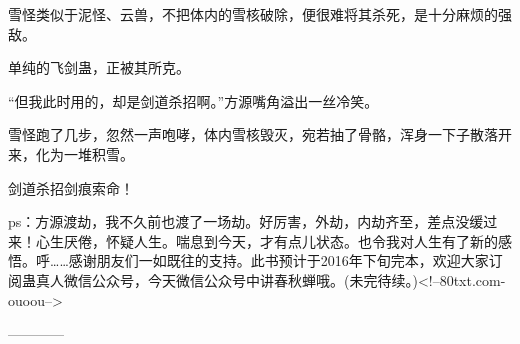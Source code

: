 \begin{this_body}
雪怪类似于泥怪、云兽，不把体内的雪核破除，便很难将其杀死，是十分麻烦的强敌。

单纯的飞剑蛊，正被其所克。

“但我此时用的，却是剑道杀招啊。”方源嘴角溢出一丝冷笑。

雪怪跑了几步，忽然一声咆哮，体内雪核毁灭，宛若抽了骨骼，浑身一下子散落开来，化为一堆积雪。

剑道杀招剑痕索命！

ps：方源渡劫，我不久前也渡了一场劫。好厉害，外劫，内劫齐至，差点没缓过来！心生厌倦，怀疑人生。喘息到今天，才有点儿状态。也令我对人生有了新的感悟。呼……感谢朋友们一如既往的支持。此书预计于2016年下旬完本，欢迎大家订阅蛊真人微信公众号，今天微信公众号中讲春秋蝉哦。(未完待续。)<!--80txt.com-ouoou-->

------------

\end{this_body}

